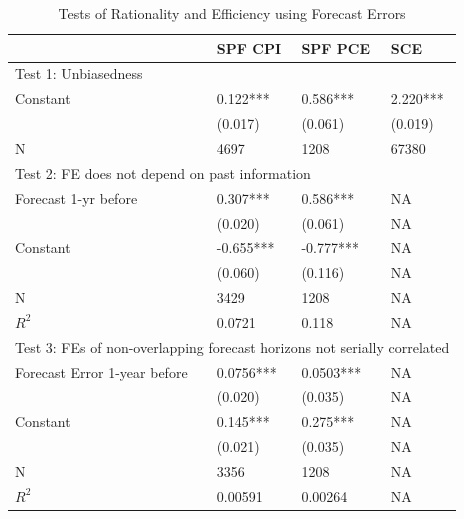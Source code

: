 \documentclass[]{article}
\begin{document}
	\begin{table}[ht]
		\caption{Tests of Rationality and Efficiency using Forecast Errors}
		\label{NullTestTable}
		\centering 
		\begin{tabular}{llll}
			\hline 
			& SPF CPI          & SPF PCE          & SCE            \\
			\hline 
			\multicolumn{4}{l}{Test 1: Unbiasedness}                                                           \\
			\hline 
			Constant                            & 0.122***         & 0.586***         & 2.220***       \\
			& (0.017)          & (0.061)          & (0.019)        \\
			\hline 
			N                                   & 4697             & 1208             & 67380          \\
			\hline 
			\multicolumn{4}{l}{Test 2: FE does not depend on past information}                                  \\
			\hline 
			Forecast 1-yr before                & 0.307***         & 0.586***         & NA             \\
			& (0.020)          & (0.061)          & NA             \\
			Constant                            & -0.655***        & -0.777***        & NA             \\
			& (0.060)          & (0.116)          & NA             \\
			\hline 
			N                                   & 3429             & 1208             & NA             \\
			$R^2$                 & 0.0721           & 0.118            & NA             \\
			\hline 
			\multicolumn{4}{l}{Test 3: FEs of non-overlapping forecast horizons not serially correlated} \\
			\hline 
			Forecast Error 1-year before        & 0.0756***        & 0.0503***        & NA             \\
			& (0.020)          & (0.035)          & NA             \\
			Constant                            & 0.145***         & 0.275***         & NA             \\
			& (0.021)          & (0.035)          & NA             \\
			\hline 
			N                                   & 3356             & 1208             & NA             \\
			$R^2$                   & 0.00591          & 0.00264          & NA             \\

\end{tabular}
\end{table}
\end{document}
